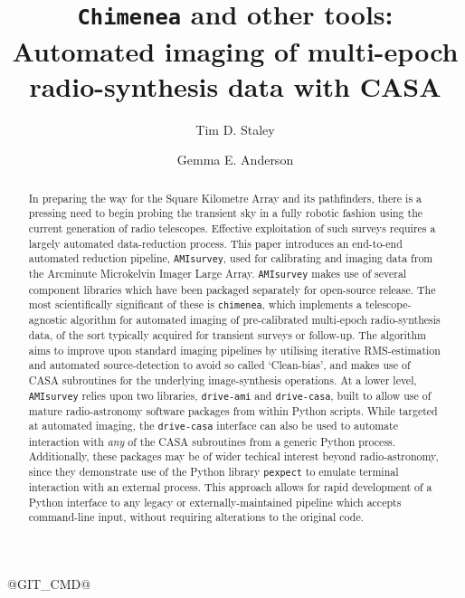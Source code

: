 \documentclass[5p,authoryear]{elsarticle}
\begin{document}
\newcommand{\code}[1]{\texttt{#1}}
\newcommand{\degrees}[1]{$#1^\circ$}

@GIT_CMD@

\begin{frontmatter}

\title{\texttt{Chimenea} and other tools: \\ Automated imaging of multi-epoch radio-synthesis data with CASA }

\author[oxford]{Tim D. Staley}
\author[oxford]{Gemma E. Anderson}

\address[oxford]{Department of Physics, University of Oxford, Denys Wilkinson Building, Keble Road, Oxford, OX1 3RH, UK}

\begin{abstract}
In preparing the way for the Square Kilometre Array and its pathfinders, there is a pressing need to begin probing the transient sky in a fully robotic fashion using the current generation of radio telescopes. Effective exploitation of such surveys requires a largely automated data-reduction process.
This paper introduces an end-to-end automated reduction pipeline, \texttt{AMIsurvey}, used for calibrating and imaging data from the Arcminute Microkelvin Imager Large Array. 
\texttt{AMIsurvey} makes use of several component libraries which have been packaged separately for open-source release. 
The most scientifically significant of these is \texttt{chimenea}, which implements a telescope-agnostic algorithm for automated imaging of pre-calibrated multi-epoch radio-synthesis data, of the sort typically acquired for transient surveys or follow-up.
The algorithm aims to improve upon standard imaging pipelines by utilising iterative RMS-estimation and automated source-detection to avoid so called `Clean-bias', and makes use of CASA subroutines for the underlying image-synthesis operations.
At a lower level, \texttt{AMIsurvey} relies upon two libraries, \texttt{drive-ami} and \texttt{drive-casa}, built to allow use of mature radio-astronomy software packages from within Python scripts. 
While targeted at automated imaging, the \texttt{drive-casa} interface can also be used to automate interaction with \textit{any} of the CASA subroutines from a generic Python process.
Additionally, these packages may be of wider techical interest beyond radio-astronomy, since they demonstrate use of the Python library \texttt{pexpect} to emulate terminal interaction with an external process. 
This approach allows for rapid development of a Python interface to any legacy or externally-maintained pipeline which accepts command-line input, without requiring alterations to the original code.


\end{abstract}
\end{frontmatter}
\end{document}
